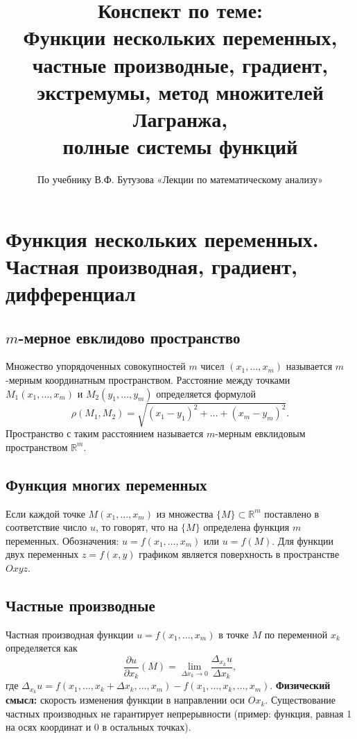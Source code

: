 \documentclass{article}
\theoremstyle{definition}
\begin{document}
\title{Конспект по теме: \\ Функции нескольких переменных, \\ частные производные, градиент, \\ экстремумы, метод множителей Лагранжа, \\ полные системы функций}
\author{По учебнику В.Ф. Бутузова «Лекции по математическому анализу»}
\date{}
\maketitle

\section{Функция нескольких переменных. Частная производная, градиент, дифференциал}

\subsection{$m$-мерное евклидово пространство}
Множество упорядоченных совокупностей $m$ чисел $(x_1,\dots,x_m)$ называется $m$-мерным координатным пространством. Расстояние между точками $M_1(x_1,\dots,x_m)$ и $M_2(y_1,\dots,y_m)$ определяется формулой
\[
\rho(M_1,M_2)=\sqrt{(x_1-y_1)^2+\dots+(x_m-y_m)^2}.
\]
Пространство с таким расстоянием называется $m$-мерным евклидовым пространством $\mathbb{R}^m$.

\subsection{Функция многих переменных}
Если каждой точке $M(x_1,\dots,x_m)$ из множества $\{M\}\subset\mathbb{R}^m$ поставлено в соответствие число $u$, то говорят, что на $\{M\}$ определена функция $m$ переменных. Обозначения: $u=f(x_1,\dots,x_m)$ или $u=f(M)$. Для функции двух переменных $z=f(x,y)$ графиком является поверхность в пространстве $Oxyz$.

\subsection{Частные производные}
Частная производная функции $u=f(x_1,\dots,x_m)$ в точке $M$ по переменной $x_k$ определяется как
\[
\frac{\partial u}{\partial x_k}(M)=\lim_{\Delta x_k\to0}\frac{\Delta_{x_k}u}{\Delta x_k},
\]
где $\Delta_{x_k}u=f(x_1,\dots,x_k+\Delta x_k,\dots,x_m)-f(x_1,\dots,x_k,\dots,x_m)$.
\textbf{Физический смысл:} скорость изменения функции в направлении оси $Ox_k$.
Существование частных производных не гарантирует непрерывности (пример: функция, равная 1 на осях координат и 0 в остальных точках).
\end{document}
